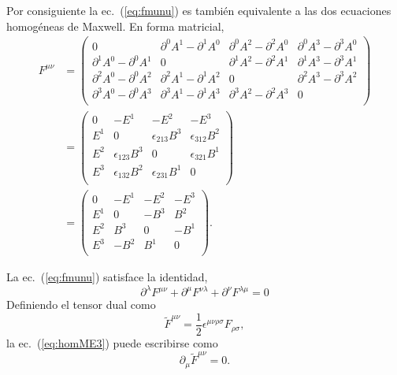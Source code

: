 Por consiguiente la ec.~(\ref{eq:fmunu}) es tambi\'en equivalente a las
dos ecuaciones homog\'eneas de Maxwell. En forma matricial,
\begin{align}
  F^{\mu\nu}&=
  \begin{pmatrix}
    0       &\partial^0A^1-\partial^1A^0&\partial^0A^2-\partial^2A^0&\partial^0A^3-\partial^3A^0\\
    \partial^1A^0-\partial^0A^1&0       &\partial^1A^2-\partial^2A^1&\partial^1A^3-\partial^3A^1\\
    \partial^2A^0-\partial^0A^2&\partial^2A^1-\partial^1A^2&0       &\partial^2A^3-\partial^3A^2\\
    \partial^3A^0-\partial^0A^3&\partial^3A^1-\partial^1A^3&\partial^3A^2-\partial^2A^3&0\\
  \end{pmatrix}\nonumber\\
  &=
  \begin{pmatrix}
    0 &-E^1   &-E^2   &-E^3   \\    
    E^1&0     &\epsilon_{213}B^3&\epsilon_{312}B^2\\
    E^2&\epsilon_{123}B^3&0     &\epsilon_{321}B^1\\
    E^3&\epsilon_{132}B^2&\epsilon_{231}B^1&0\\
  \end{pmatrix}\nonumber\\
  &=
\label{eq:matrixfmunu}
  \begin{pmatrix}
    0 &-E^1&-E^2&-E^3   \\    
    E^1&0  &-B^3&B^2\\
    E^2&B^3 &0  &-B^1\\
    E^3&-B^2&B^1 &0\\
  \end{pmatrix}.
\end{align}

La ec.~(\ref{eq:fmunu}) satisface la identidad,
\begin{equation}
  \label{eq:homME3}
  \partial^\lambda F^{\mu\nu}+\partial^\mu F^{\nu\lambda}+\partial^\nu F^{\lambda\mu}=0
\end{equation}
Definiendo el tensor dual como
\begin{equation*}
  \tilde{F}^{\mu\nu}=\frac{1}{2}\epsilon^{\mu\nu\rho\sigma}F_{\rho\sigma},
\end{equation*}
la ec.~(\ref{eq:homME3}) puede escribirse como
\begin{equation}
  \label{eq:homEM4}
  \partial_\mu\tilde{F}^{\mu\nu}=0.
\end{equation}

